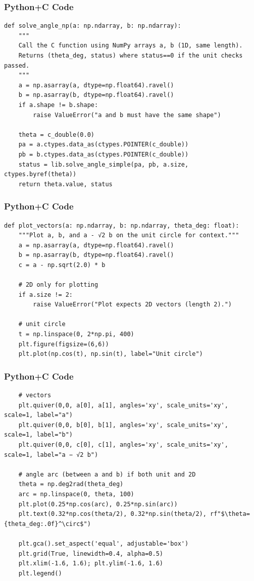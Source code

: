 \documentclass{beamer}
\begin{document}
    \begin{frame}[fragile]
    \frametitle{Python+C Code}
    \begin{lstlisting}
def solve_angle_np(a: np.ndarray, b: np.ndarray):
    """
    Call the C function using NumPy arrays a, b (1D, same length).
    Returns (theta_deg, status) where status==0 if the unit checks passed.
    """
    a = np.asarray(a, dtype=np.float64).ravel()
    b = np.asarray(b, dtype=np.float64).ravel()
    if a.shape != b.shape:
        raise ValueError("a and b must have the same shape")

    theta = c_double(0.0)
    pa = a.ctypes.data_as(ctypes.POINTER(c_double))
    pb = b.ctypes.data_as(ctypes.POINTER(c_double))
    status = lib.solve_angle_simple(pa, pb, a.size, ctypes.byref(theta))
    return theta.value, status
 \end{lstlisting}
    \end{frame}
    \begin{frame}[fragile]
    \frametitle{Python+C Code}
    \begin{lstlisting}
def plot_vectors(a: np.ndarray, b: np.ndarray, theta_deg: float):
    """Plot a, b, and a - √2 b on the unit circle for context."""
    a = np.asarray(a, dtype=np.float64).ravel()
    b = np.asarray(b, dtype=np.float64).ravel()
    c = a - np.sqrt(2.0) * b

    # 2D only for plotting
    if a.size != 2:
        raise ValueError("Plot expects 2D vectors (length 2).")

    # unit circle
    t = np.linspace(0, 2*np.pi, 400)
    plt.figure(figsize=(6,6))
    plt.plot(np.cos(t), np.sin(t), label="Unit circle")
 \end{lstlisting}
    \end{frame}
    \begin{frame}[fragile]
    \frametitle{Python+C Code}
    \begin{lstlisting}
    # vectors
    plt.quiver(0,0, a[0], a[1], angles='xy', scale_units='xy', scale=1, label="a")
    plt.quiver(0,0, b[0], b[1], angles='xy', scale_units='xy', scale=1, label="b")
    plt.quiver(0,0, c[0], c[1], angles='xy', scale_units='xy', scale=1, label="a − √2 b")

    # angle arc (between a and b) if both unit and 2D
    theta = np.deg2rad(theta_deg)
    arc = np.linspace(0, theta, 100)
    plt.plot(0.25*np.cos(arc), 0.25*np.sin(arc))
    plt.text(0.32*np.cos(theta/2), 0.32*np.sin(theta/2), rf"$\theta={theta_deg:.0f}^\circ$")

    plt.gca().set_aspect('equal', adjustable='box')
    plt.grid(True, linewidth=0.4, alpha=0.5)
    plt.xlim(-1.6, 1.6); plt.ylim(-1.6, 1.6)
    plt.legend()
     \end{lstlisting}
    \end{frame}
\end{document}
